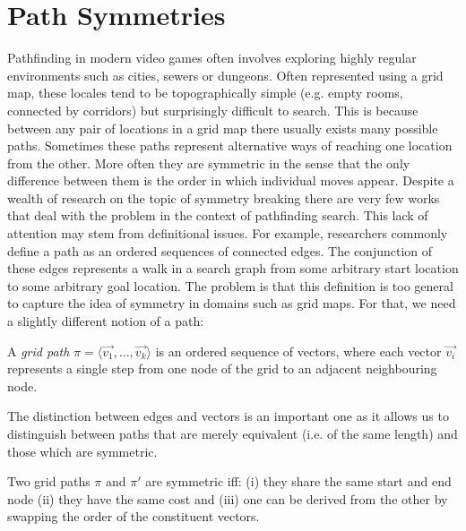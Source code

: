 \section{Path Symmetries}
Pathfinding in modern video games often involves exploring highly regular
environments such as cities, sewers or dungeons. Often represented using a
grid map, these locales tend to be topographically simple (e.g. empty rooms, 
connected by corridors) but surprisingly difficult to search. 
This is because between any pair of locations in a grid map 
there usually exists many possible paths. Sometimes these paths represent 
alternative ways of reaching one location from the other. More often they 
are symmetric in the sense that the only difference between them is the order
in which individual moves appear. 
Despite a wealth of research on the topic of symmetry breaking there are very 
few works that deal with the problem in the context of pathfinding search. 
This lack of attention may stem from definitional issues. For example, researchers commonly
define a path as an ordered sequences of connected edges. The conjunction of these 
edges represents a walk in a search graph from some arbitrary start location to some 
arbitrary goal location.  The problem is that this definition is too general to capture 
the idea of symmetry in domains such as grid maps. For that, we need a slightly different 
notion of a path:

\begin{definition}
A \emph{grid path} $\pi = \langle \vec{v_1}, \ldots, \vec{v_k} \rangle$ is an ordered sequence 
of vectors, where each vector $\vec{v_i}$ represents a single step from one node of 
the grid to an adjacent neighbouring node. 
\end{definition}

The distinction between edges and vectors is an important one as it allows us to
distinguish between paths that are merely equivalent (i.e. of the same length)
and those which are symmetric. 

\begin{definition}
Two grid paths $\pi$ and $\pi'$ are symmetric iff: (i) they share the same 
start and end node (ii) they have the same cost and (iii) one can be derived from 
the other by swapping the order of the constituent vectors.
\end{definition}

